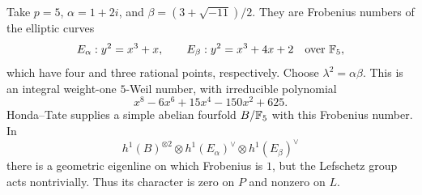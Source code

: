 \begin{example}
\label{A:lefschetz-counterexample}
Take $p=5$, $\alpha=1+2i$, and
$\beta=(3+\sqrt{-11})/2$. They are Frobenius numbers of the
elliptic curves
\[
 E_\alpha:y^2=x^3+x,\qquad
 E_\beta:y^2=x^3+4x+2
 \quad\text{over }\mathbb F_5,
\]
which have four and three rational points, respectively. Choose
$\lambda^2=\alpha\beta$. This is an integral weight-one
$5$-Weil number, with irreducible polynomial
\[
 x^8-6x^6+15x^4-150x^2+625.
\]
Honda--Tate supplies a simple abelian fourfold $B/\mathbb F_5$ with this
Frobenius number. In
\[
 h^1(B)^{\otimes2}\otimes h^1(E_\alpha)^\vee
                      \otimes h^1(E_\beta)^\vee
\]
there is a geometric eigenline on which Frobenius is $1$, but
the Lefschetz group acts nontrivially. Thus its character is zero
on $P$ and nonzero on $L$.
\end{example}
